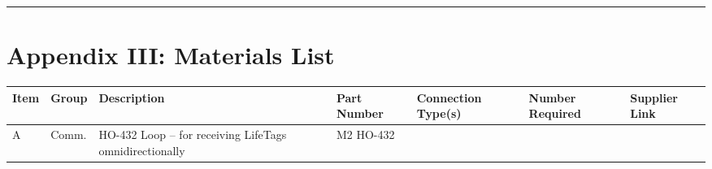 \documentclass[
]{article}
\begin{document}
\begin{center}\rule{0.5\linewidth}{0.5pt}\end{center}

\hypertarget{appendix-iii-materials-list}{%
\section{Appendix III: Materials
List}\label{appendix-iii-materials-list}}

\begin{longtable}[]{@{}lllllll@{}}
\toprule
\begin{minipage}[b]{0.12\columnwidth}\raggedright
\textbf{Item}\strut
\end{minipage} & \begin{minipage}[b]{0.12\columnwidth}\raggedright
\textbf{Group}\strut
\end{minipage} & \begin{minipage}[b]{0.12\columnwidth}\raggedright
\textbf{Description}\strut
\end{minipage} & \begin{minipage}[b]{0.12\columnwidth}\raggedright
\textbf{Part Number}\strut
\end{minipage} & \begin{minipage}[b]{0.12\columnwidth}\raggedright
\textbf{Connection Type(s)}\strut
\end{minipage} & \begin{minipage}[b]{0.12\columnwidth}\raggedright
\textbf{Number Required}\strut
\end{minipage} & \begin{minipage}[b]{0.12\columnwidth}\raggedright
\textbf{Supplier Link}\strut
\end{minipage}\tabularnewline
\midrule
\endhead
\begin{minipage}[t]{0.12\columnwidth}\raggedright
A\strut
\end{minipage} & \begin{minipage}[t]{0.12\columnwidth}\raggedright
Comm.\strut
\end{minipage} & \begin{minipage}[t]{0.12\columnwidth}\raggedright
HO-432 Loop -- for receiving LifeTags omnidirectionally\strut
\end{minipage} & \begin{minipage}[t]{0.12\columnwidth}\raggedright
M2 HO-432\strut
\end{minipage} & \begin{minipage}[t]{0.12\columnwidth}\raggedright

\end{minipage}
\end{longtable}
\end{document}
